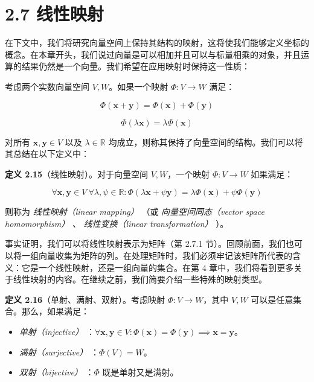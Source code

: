 \section*{2.7 线性映射}
\label{sec:2.7}

在下文中，我们将研究向量空间上保持其结构的映射，这将使我们能够定义坐标的概念。在本章开头，我们说过向量是可以相加并且可以与标量相乘的对象，并且运算的结果仍然是一个向量。我们希望在应用映射时保持这一性质：

考虑两个实数向量空间 $ V, W $。如果一个映射 $ \Phi : V \to W $ 满足：

\begin{equation}
\Phi(\boldsymbol{x} + \boldsymbol{y}) = \Phi(\boldsymbol{x}) + \Phi(\boldsymbol{y})
\tag{2.85}\label{eq:2-85}
\end{equation}

\begin{equation}
\Phi(\lambda \boldsymbol{x}) = \lambda \Phi(\boldsymbol{x})
\tag{2.86}\label{eq:2-86}
\end{equation}

对所有 $ \boldsymbol{x}, \boldsymbol{y} \in V $ 以及 $ \lambda \in \mathbb{R} $ 均成立，则称其保持了向量空间的结构。我们可以将其总结在以下定义中：

\textbf{定义 2.15}（线性映射）。对于向量空间 $ V, W $，一个映射 $ \Phi : V \to W $ 如果满足：

\begin{equation}
\forall \boldsymbol{x}, \boldsymbol{y} \in V \ \forall \lambda, \psi \in \mathbb{R} : \Phi(\lambda \boldsymbol{x} + \psi \boldsymbol{y}) = \lambda \Phi(\boldsymbol{x}) + \psi \Phi(\boldsymbol{y})
\tag{2.87}\label{eq:2-87}
\end{equation}

则称为 \emph{线性映射（linear mapping）} （或 \emph{向量空间同态（vector space homomorphism）} 、 \emph{线性变换（linear transformation）} ）。

事实证明，我们可以将线性映射表示为矩阵（第 2.7.1 节）。回顾前面，我们也可以将一组向量收集为矩阵的列。在处理矩阵时，我们必须牢记该矩阵所代表的含义：它是一个线性映射，还是一组向量的集合。在第 4 章中，我们将看到更多关于线性映射的内容。在继续之前，我们简要介绍一些特殊的映射类型。

\textbf{定义 2.16}（单射、满射、双射）。考虑映射 $ \Phi : V \to W $，其中 $ V, W $ 可以是任意集合。那么，如果满足：

\begin{itemize}
\item \emph{单射（injective）} ：$ \forall \boldsymbol{x}, \boldsymbol{y} \in V : \Phi(\boldsymbol{x}) = \Phi(\boldsymbol{y}) \implies \boldsymbol{x} = \boldsymbol{y} $。
\item \emph{满射（surjective）} ：$ \Phi(V) = W $。
\item \emph{双射（bijective）} ：$ \Phi $ 既是单射又是满射。
\end{itemize}

